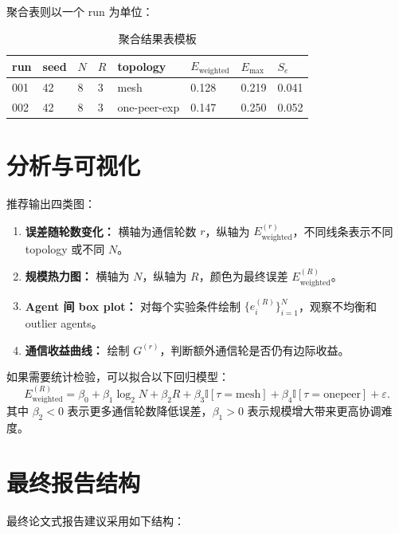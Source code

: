 \documentclass[UTF8,11pt,a4paper,fontset=fandol]{ctexart}
\begin{document}
聚合表则以一个 run 为单位：

\begin{table}[h]
\centering
\caption{聚合结果表模板}
\small
\begin{tabular}{llllllll}
\toprule
run & seed & \(N\) & \(R\) & topology &
\(E_{\mathrm{weighted}}\) & \(E_{\max}\) & \(S_e\) \\
\midrule
001 & 42 & 8 & 3 & mesh & 0.128 & 0.219 & 0.041 \\
002 & 42 & 8 & 3 & one-peer-exp & 0.147 & 0.250 & 0.052 \\
\bottomrule
\end{tabular}
\end{table}

\section{分析与可视化}

推荐输出四类图：

\begin{enumerate}
  \item \textbf{误差随轮数变化：}
  横轴为通信轮数 \(r\)，纵轴为 \(E_{\mathrm{weighted}}^{(r)}\)，不同线条表示不同 topology 或不同 \(N\)。
  \item \textbf{规模热力图：}
  横轴为 \(N\)，纵轴为 \(R\)，颜色为最终误差 \(E_{\mathrm{weighted}}^{(R)}\)。
  \item \textbf{Agent 间 box plot：}
  对每个实验条件绘制 \(\{e_i^{(R)}\}_{i=1}^{N}\)，观察不均衡和 outlier agents。
  \item \textbf{通信收益曲线：}
  绘制 \(G^{(r)}\)，判断额外通信轮是否仍有边际收益。
\end{enumerate}

如果需要统计检验，可以拟合以下回归模型：
\[
E_{\mathrm{weighted}}^{(R)}
=
\beta_0
+\beta_1\log_2 N
+\beta_2 R
+\beta_3 \mathbb{I}[\tau=\mathrm{mesh}]
+\beta_4 \mathbb{I}[\tau=\mathrm{onepeer}]
+\varepsilon.
\]
其中 \(\beta_2<0\) 表示更多通信轮数降低误差，\(\beta_1>0\) 表示规模增大带来更高协调难度。

\section{最终报告结构}

最终论文式报告建议采用如下结构：
\end{document}
